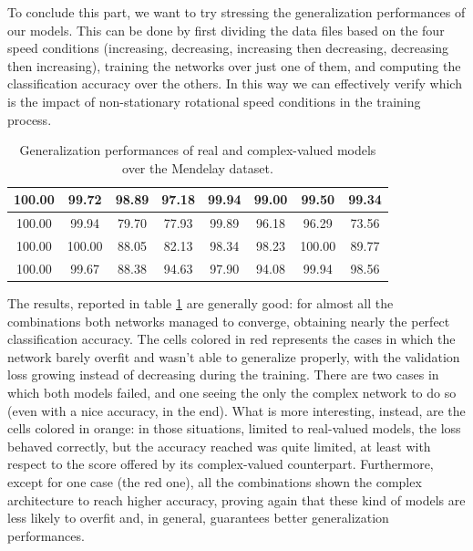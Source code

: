 \documentclass[../main.tex]{subfiles}
\begin{document}
To conclude this part, we want to try stressing the generalization performances of our models. This can be done by first dividing the data files based on the four speed conditions (increasing, decreasing, increasing then decreasing, decreasing then increasing), training the networks over just one of them, and computing the classification accuracy over the others. In this way we can effectively verify which is the impact of non-stationary rotational speed conditions in the training process.
\begin{table}[ht]
	\centering
	\begin{tabular}{||c|c||c|c||c|c||c|c||}
		\toprule
		100.00 & 99.72 & 98.89 & 97.18 & 99.94 & 99.00 & 99.50 & 99.34\\
		\midrule
		100.00 & 99.94 & \cellcolor{red} 79.70 & \cellcolor{red} 77.93 & 99.89 & 96.18 & 96.29 & \cellcolor{orange} 73.56\\
		\midrule
		100.00 & 100.00 & \cellcolor{red} 88.05 & \cellcolor{red} 82.13 & 98.34 & 98.23 & 100.00 & \cellcolor{orange} 89.77\\
		\midrule
		100.00 & 99.67 & \cellcolor{red} 88.38 & 94.63 & 97.90 & 94.08 & 99.94 & 98.56\\
		\bottomrule
	\end{tabular}
	\caption{Generalization performances of real and complex-valued models over the Mendelay dataset.}
	\label{tab:mendeley_generalization}
\end{table}
The results, reported in table \ref{tab:mendeley_generalization} are generally good: for almost all the combinations both networks managed to converge, obtaining nearly the perfect classification accuracy. The cells colored in red represents the cases in which the network barely overfit and wasn't able to generalize properly, with the validation loss growing instead of decreasing during the training. There are two cases in which both models failed, and one seeing the only the complex network to do so (even with a nice accuracy, in the end). What is more interesting, instead, are the cells colored in orange: in those situations, limited to real-valued models, the loss behaved correctly, but the accuracy reached was quite limited, at least with respect to the score offered by its complex-valued counterpart. Furthermore, except for one case (the red one), all the combinations shown the complex architecture to reach higher accuracy, proving again that these kind of models are less likely to overfit and, in general, guarantees better generalization performances.




	
\end{document}
